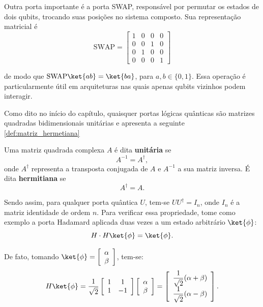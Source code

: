 Outra porta importante é a porta SWAP, responsável por permutar os estados de dois qubits, trocando suas posições no sistema composto. Sua representação matricial é
$$
    \mathrm{SWAP}= \left[
    \begin{array}{cccc}
        1 & 0 & 0 & 0\\
        0 & 0 & 1 & 0\\
        0 & 1 & 0 & 0\\
        0 & 0 & 0 & 1
    \end{array} \right]
$$

\noindent de modo que $\mathrm{SWAP}\ket{ab}=\ket{ba}$, para $a,b\in\{0,1\}$. Essa operação é particularmente útil em arquiteturas nas quais apenas qubits vizinhos podem interagir.

Como dito no início do capítulo, quaisquer portas lógicas quânticas são matrizes quadradas bidimensionais unitárias e \textcite[pag. 425]{Anton2012} apresenta a seguinte
\autoref{def:matriz_hermetiana}

    \begin{defi}
        \label{def:matriz_hermetiana}
        Uma matriz quadrada complexa $A$ é dita \textbf{unitária} se $$A^{-1}=A^{\dagger},$$ onde $A^{\dagger}$ representa a transposta conjugada de $A$ e $A^{-1}$ a sua matriz inversa. É dita \textbf{hermitiana} se $$A^{\dagger}=A.$$
    \end{defi}

\noindent Sendo assim, para qualquer porta quântica $U$, tem-se $UU^{\dagger}=I_n$, onde $I_n$ é a matriz identidade de ordem $n$. Para verificar essa propriedade, tome como exemplo a porta Hadamard aplicada duas vezes a um estado arbitrário $\ket{\phi}$:
    $$
        H\cdot H\ket{\phi} = \ket{\phi}.
    $$

De fato, tomando $\ket{\phi}=\left[\begin{array}{c}
         \alpha \\
         \beta
    \end{array}\right]$, tem-se:
    $$
        H\ket{\phi}= \dfrac{1}{\sqrt{2}} \left[\begin{array}{cc}
             1 & 1 \\
             1 & -1
        \end{array}\right]\left[\begin{array}{c}
             \alpha \\
             \beta
        \end{array}\right] = \left[\begin{array}{c}
             \dfrac{1}{\sqrt{2}}(\alpha+\beta) \\
             \dfrac{1}{\sqrt{2}}(\alpha - \beta)
        \end{array}\right].
    $$

